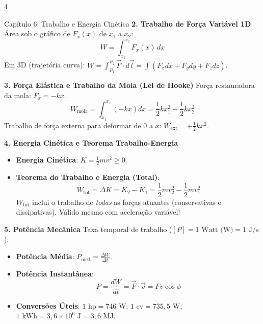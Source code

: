 \documentclass[9pt,a4paper,landscape]{extarticle}
\begin{document}
\begin{multicols*}{4}
\begin{greenbox}{Capítulo 6: Trabalho e Energia Cinética}
\textbf{2. Trabalho de Força Variável 1D}
Área sob o gráfico de $F_x(x)$ de $x_1$ a $x_2$:
\begin{equation*}
    W = \int_{x_1}^{x_2} F_x(x) \, dx
\end{equation*}
Em 3D (trajetória curva): $W = \int_{P_1}^{P_2} \vec{F} \cdot d\vec{l} = \int (F_x dx + F_y dy + F_z dz)$.

\textbf{3. Força Elástica e Trabalho da Mola (Lei de Hooke)}
Força restauradora da mola: $F_x = -k x$.
\begin{equation*}
    W_{\text{mola}} = \int_{x_1}^{x_2} (-kx) dx = \frac{1}{2} k x_1^2 - \frac{1}{2} k x_2^2
\end{equation*}
Trabalho de força externa para deformar de 0 a $x$: $W_{\text{ext}} = +\frac{1}{2} k x^2$.

\textbf{4. Energia Cinética e Teorema Trabalho-Energia}
\begin{itemize}
    \item \textbf{Energia Cinética}: $K = \frac{1}{2} m v^2 \ge 0$.
    \item \textbf{Teorema do Trabalho e Energia (Total)}:
    \begin{equation*}
        W_{\text{tot}} = \Delta K = K_2 - K_1 = \frac{1}{2} m v_2^2 - \frac{1}{2} m v_1^2
    \end{equation*}
    $W_{\text{tot}}$ inclui o trabalho de \emph{todas} as forças atuantes (conservativas e dissipativas). Válido mesmo com aceleração variável!
\end{itemize}

\textbf{5. Potência Mecânica}
Taxa temporal de trabalho ($[P] = 1\text{ Watt (W)} = 1\text{ J/s}$):
\begin{itemize}
    \item \textbf{Potência Média}: $P_{\text{méd}} = \frac{\Delta W}{\Delta t}$.
    \item \textbf{Potência Instantânea}:
    \begin{equation*}
        P = \frac{dW}{dt} = \vec{F} \cdot \vec{v} = F v \cos\phi
    \end{equation*}
    \item \textbf{Conversões Úteis}: $1\text{ hp} = 746\text{ W}$; $1\text{ cv} = 735{,}5\text{ W}$; $1\text{ kWh} = 3{,}6 \times 10^6\text{ J} = 3{,}6\text{ MJ}$.
\end{itemize}
\end{greenbox}


\end{multicols*}
\end{document}
